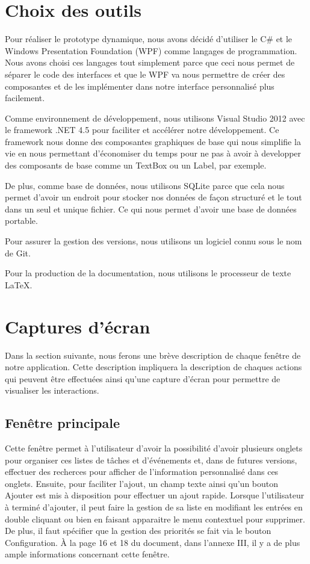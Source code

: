 \documentclass[letterpaper, oneside, 12pt, these, creativecommons]{thETS}
\begin{document}
\section{Choix des outils}

Pour réaliser le prototype dynamique, nous avons décidé d'utiliser le C\# et le Windows Presentation Foundation (WPF) comme langages de programmation. Nous avons choisi ces langages tout simplement parce que ceci nous permet de séparer le code des interfaces et que le WPF va nous permettre de créer des composantes et de les implémenter dans notre interface personnalisé plus facilement. 

Comme environnement de développement, nous utilisons Visual Studio 2012 avec le framework .NET 4.5 pour faciliter et accélérer notre développement. Ce framework nous donne des composantes graphiques de base qui nous simplifie la vie en nous permettant d'économiser du temps pour ne pas à avoir à developper des composants de base comme un TextBox ou un Label, par exemple.

De plus, comme base de données, nous utilisons SQLite parce que cela nous permet d'avoir un endroit pour stocker nos données de façon structuré et le tout dans un seul et unique fichier. Ce qui nous permet d'avoir une base de données portable.

Pour assurer la gestion des versions, nous utilisons un logiciel connu sous le nom de Git.

Pour la production de la documentation, nous utilisons le processeur de texte \LaTeX.

\newpage

\section{Captures d'écran}

Dans la section suivante, nous ferons une brève description de chaque fenêtre de notre application. Cette description impliquera la description de chaques actions qui peuvent être effectuées ainsi qu'une capture d'écran pour permettre de visualiser les interactions.

\subsection{Fenêtre principale}

Cette fenêtre permet à l'utilisateur d'avoir la possibilité d'avoir plusieurs onglets pour organiser ces listes de tâches et d'événements et, dans de futures versions, effectuer des recherces pour afficher de l'information personnalisé dans ces onglets. Ensuite, pour faciliter l'ajout, un champ texte ainsi qu'un bouton Ajouter est mis à disposition pour effectuer un ajout rapide. Lorsque l'utilisateur à terminé d'ajouter, il peut faire la gestion de sa liste en modifiant les entrées en double cliquant ou bien en faisant apparaitre le menu contextuel pour supprimer. De plus, il faut spécifier que la gestion des priorités se fait via le bouton Configuration. À la page 16 et 18 du document, dans l'annexe III, il y a de plus ample informations concernant cette fenêtre.
\end{document}
